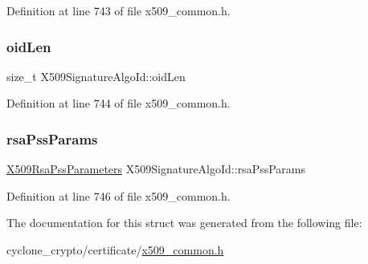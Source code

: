 Definition at line 743 of file x509\+\_\+common.\+h.

\mbox{\label{structX509SignatureAlgoId_a4a15b78049b8e360a069b72f0c79b0f4}} 
\subsubsection{\texorpdfstring{oid\+Len}{oidLen}}
{\footnotesize\ttfamily size\+\_\+t X509\+Signature\+Algo\+Id\+::oid\+Len}



Definition at line 744 of file x509\+\_\+common.\+h.

\mbox{\label{structX509SignatureAlgoId_aabb448030d8783d06739cdd2c660dde4}} 
\subsubsection{\texorpdfstring{rsa\+Pss\+Params}{rsaPssParams}}
{\footnotesize\ttfamily \hyperlink{structX509RsaPssParameters}{X509\+Rsa\+Pss\+Parameters} X509\+Signature\+Algo\+Id\+::rsa\+Pss\+Params}



Definition at line 746 of file x509\+\_\+common.\+h.



The documentation for this struct was generated from the following file\+:\begin{DoxyCompactItemize}
\item 
cyclone\+\_\+crypto/certificate/\hyperlink{certificate_2x509__common_8h}{x509\+\_\+common.\+h}\end{DoxyCompactItemize}
